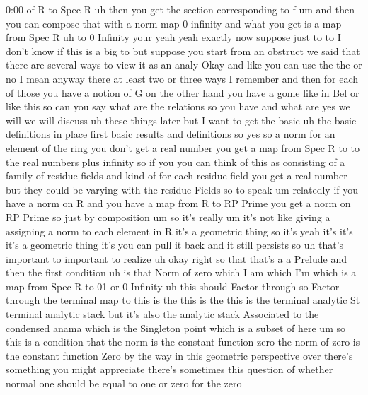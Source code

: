 \begin{unfinished}{0:00}
of  R  to  Spec  R  uh  then  you  get  the
section  corresponding  to  f  um  and  then
you  can  compose  that  with  a  norm  map  0
infinity  and  what  you  get  is  a  map  from
Spec  R  uh  to  0
Infinity  your  yeah  yeah  exactly  now
suppose  just  to  to  I  don't  know  if  this
is  a  big  to  but  suppose  you  start  from
an  obstruct  we  said  that  there  are
several  ways  to  view  it  as  an  analy
Okay  and  like  you  can  use  the  the  or  no
I  mean  anyway  there  at  least  two  or
three  ways  I  remember  and  then  for  each
of  those  you  have  a  notion  of  G  on  the
other  hand  you  have  a  gome  like  in  Bel
or  like  this  so  can  you  say  what  are  the
relations  so  you  have  and  what  are  yes
we  will  we  will  discuss  uh  these  things
later  but  I  want  to  get  the  basic  uh  the
basic  definitions  in  place  first  basic
results  and
definitions  so  yes  so  a  norm  for  an
element  of  the  ring  you  don't  get  a  real
number  you  get  a  map  from  Spec  R  to  to
the  real  numbers  plus  infinity  so  if  you
you  can  think  of  this  as  consisting  of  a
family  of  residue  fields  and  kind  of  for
each  residue  field  you  get  a  real  number
but  they  could  be  varying  with  the
residue  Fields  so  to  speak  um  relatedly
if  you  have  a  norm  on  R  and  you  have  a
map  from  R  to  RP  Prime  you  get  a  norm  on
RP  Prime
so  just  by  composition  um  so  it's  really
um  it's  not  like  giving  a  assigning  a
norm  to  each  element  in  R  it's  a
geometric  thing  so
it's  yeah  it's  it's  it's  a  geometric
thing  it's  you  can  pull  it  back  and  it
still  persists  so  uh  that's  important  to
important  to
realize  uh  okay  right  so  that  that's  a  a
Prelude  and  then  the  first  condition  uh
is  that  Norm  of
zero  which  I  am  which  I'm  which  is  a  map
from  Spec  R  to  01  or  0  Infinity  uh  this
should  Factor  through
so  Factor  through  the  terminal  map  to
this  is  the  this  is
the  this  is  the  terminal  analytic  St
terminal  analytic  stack  but  it's  also
the  analytic  stack  Associated  to  the
condensed  anama  which  is  the  Singleton
point  which  is  a  subset  of  here  um  so
this  is  a  condition  that  the  norm  is  the
constant  function  zero  the  norm  of  zero
is  the  constant  function  Zero  by  the  way
in  this  geometric  perspective  over
there's  something  you  might  appreciate
there's  sometimes  this  question  of
whether  normal  one  should  be  equal  to
one  or  zero  for  the  zero

\end{unfinished}
